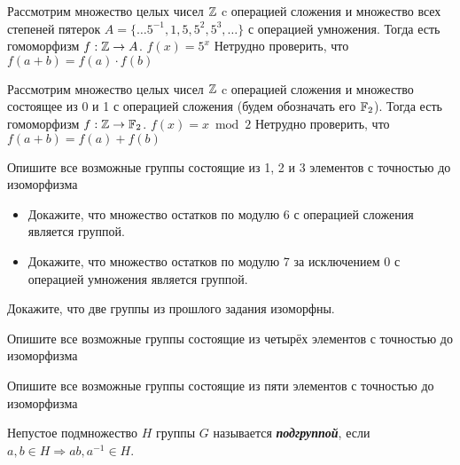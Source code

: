 \documentclass{article}
\begin{document}
\begin{example}
	Рассмотрим множество целых чисел $\mathbb{Z}$ c операцией сложения и множество всех степеней пятерок $A = \{\dotsc 5^{-1}, 1, 5, 5^{2}, 5^{3}, \dotsc\}$ с операцией умножения. Тогда есть гомоморфизм $f : \mathbb{Z} \rightarrow A$. $f(x) = 5^x$
	Нетрудно проверить, что $f(a + b) = f(a) \cdot f(b)$
\end{example}

\begin{example}
	Рассмотрим множество целых чисел $\mathbb{Z}$ c операцией сложения и множество состоящее из 0 и 1 с операцией сложения (будем обозначать его $\mathbb{F}_2$). Тогда есть гомоморфизм $f : \mathbb{Z} \rightarrow \mathbb{F}_2$. $f(x) = x \bmod 2$
	Нетрудно проверить, что $f(a + b) = f(a) + f(b)$
\end{example}

\begin{task_boxed}
	Опишите все возможные группы состоящие из 1, 2 и 3 элементов с точностью до изоморфизма
\end{task_boxed}

\begin{task_boxed}
	\begin{itemize}
		\item  Докажите, что множество остатков по модулю 6 с операцией сложения является группой.
		\item  Докажите, что  множество остатков по модулю 7 за исключением 0 с операцией умножения является группой.
	\end{itemize}
\end{task_boxed}

\begin{task_boxed}
	Докажите, что две группы из прошлого задания изоморфны.
\end{task_boxed}

\begin{task_boxed}
	Опишите все возможные группы состоящие из четырёх элементов с точностью до изоморфизма
\end{task_boxed}

\begin{task_boxed}[ *]
	Опишите все возможные группы состоящие из пяти элементов с точностью до изоморфизма
\end{task_boxed}

\begin{definition_boxed}
	Непустое подмножество $H$ группы $G$ называется \textbf{\textit{подгруппой}}, если $a, b \in H \Rightarrow ab, a^{-1} \in H$.
\end{definition_boxed}
\end{document}

